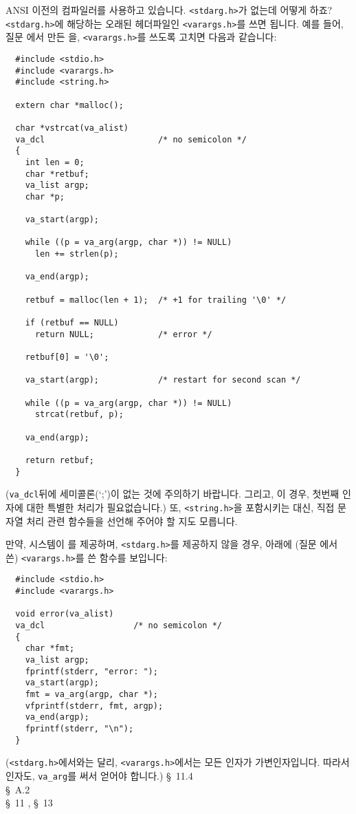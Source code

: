 \begin{faq}
	ANSI 이전의 컴파일러를 사용하고 있습니다.  \verb+<stdarg.h>+가 없는데
	어떻게 하죠?
\A
	\verb+<stdarg.h>+에 해당하는 오래된 헤더파일인 \verb+<varargs.h>+를
	쓰면 됩니다. 예를 들어, 질문 에서 만든 을,
        \verb+<varargs.h>+를 쓰도록 고치면 다음과 같습니다:
\begin{verbatim}
  #include <stdio.h>
  #include <varargs.h>
  #include <string.h>

  extern char *malloc();

  char *vstrcat(va_alist)
  va_dcl                       /* no semicolon */
  {
    int len = 0;
    char *retbuf;
    va_list argp;
    char *p;

    va_start(argp);

    while ((p = va_arg(argp, char *)) != NULL)
      len += strlen(p);

    va_end(argp);

    retbuf = malloc(len + 1);  /* +1 for trailing '\0' */
 
    if (retbuf == NULL)
      return NULL;             /* error */

    retbuf[0] = '\0';

    va_start(argp);            /* restart for second scan */

    while ((p = va_arg(argp, char *)) != NULL)
      strcat(retbuf, p);

    va_end(argp);

    return retbuf;
  }
\end{verbatim}
	\noindent (\verb+va_dcl+뒤에 세미콜론(`;')이 없는 것에 주의하기 바랍니다.
	그리고, 이 경우, 첫번째 인자에 대한 특별한 처리가 필요없습니다.) 또,
        \verb+<string.h>+을 포함시키는 대신, 직접 문자열 처리 관련 함수들을
        선언해 주어야 할 지도 모릅니다.

        만약, 시스템이 를 제공하며, \verb+<stdarg.h>+를 제공하지
        않을 경우, 아래에 (질문 에서 쓴) \verb+<varargs.h>+를 쓴
         함수를 보입니다:
\begin{verbatim}
  #include <stdio.h>
  #include <varargs.h>

  void error(va_alist)
  va_dcl                  /* no semicolon */
  {
    char *fmt;
    va_list argp;
    fprintf(stderr, "error: ");
    va_start(argp);
    fmt = va_arg(argp, char *);
    vfprintf(stderr, fmt, argp);
    va_end(argp);
    fprintf(stderr, "\n");
  }
\end{verbatim}
	\noindent (\verb+<stdarg.h>+에서와는 달리, \verb+<varargs.h>+에서는
        모든 인자가 가변인자입니다. 따라서  인자도, \verb+va_arg+를 써서
        얻어야 합니다.)
\R
	\cite{hs} \S\ 11.4  \\
	\cite{ctp} \S\ A.2  \\
	\cite{pcs} \S\ 11 , \S\ 13 
\end{faq}

